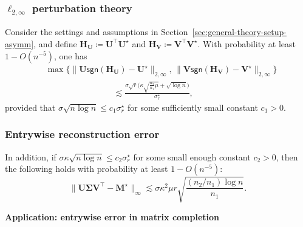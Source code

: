 \documentclass[compress,
mathserif,wide,%
]{beamer}
\begin{document}
\begin{frame}
	\frametitle{$\ell_{2, \infty}$ perturbation theory}
\begin{theorem}
\label{thm:2-inf-asymm}
%
Consider the settings and
assumptions in Section~\ref{sec:general-theory-setup-asymm}, and
define $\bm{H}_{\bm{U}}\coloneqq\bm{U}^{\top}\bm{U}^{\star}$ and
$\bm{H}_{\bm{V}}\coloneqq\bm{V}^{\top}\bm{V}^{\star}$. With probability
at least $1-O(n^{-5})$, one has
%
\begin{align}
	& \max\Big\{\|\bm{U}\mathsf{sgn}(\bm{H}_{\bm{U}})-\bm{U}^{\star}\|_{2,\infty},\, \|\bm{V}\mathsf{sgn}(\bm{H}_{\bm{V}})-\bm{V}^{\star}\|_{2,\infty} \Big\} \nonumber\\
	& \qquad\qquad\qquad\qquad \lesssim\frac{\sigma\sqrt{ r}\big(\kappa\sqrt{\frac{n_{2}}{n_{1}}\mu}+\sqrt{\log n}\big)}{\sigma_{r}^{\star}},\label{eq:main-result-2-infty-general-asymm}
\end{align}
%
provided that $\sigma\sqrt{n\log n}\leq c_{1}\sigma_{r}^{\star}$
for some sufficiently small constant $c_{1}>0$. 
%
\end{theorem}

\end{frame}

\begin{frame}
	\frametitle{Entrywise reconstruction error}
	\begin{corollary}
	In addition, if $\sigma\kappa\sqrt{n\log n}\leq c_{2}\sigma_{r}^{\star}$
for some small enough constant $c_{2}>0$, then the following holds with
probability at least $1-O(n^{-5})$:
%
\begin{equation}
	\|\bm{U}\bm{\Sigma}\bm{V}^{\top}-\bm{M}^{\star}\|_{\infty}\lesssim\sigma\kappa^{2}\mu r\sqrt{\frac{(n_2/n_1) \log n}{n_{1}}}.\label{eq:main-result-infty-general-asymm}
\end{equation}
	\end{corollary}
\end{frame}


\begin{frame}[plain]
\vfill
\centering
{\large \bf Application: entrywise error in matrix completion}
\vfill
\end{frame}
\end{document}
